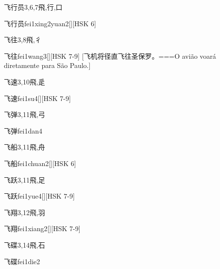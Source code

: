 \begin{Entry}{飞行员}{3,6,7}{⾶,⾏,⼝}
  \begin{Phonetics}{飞行员}{fei1xing2yuan2}[][HSK 6]
  \end{Phonetics}
\end{Entry}

\begin{Entry}{飞往}{3,8}{⾶,⼻}
  \begin{Phonetics}{飞往}{fei1wang3}[][HSK 7-9]
    [飞机将径直飞往圣保罗。===O avião voará diretamente para São Paulo.]
  \end{Phonetics}
\end{Entry}

\begin{Entry}{飞速}{3,10}{⾶,⾡}
  \begin{Phonetics}{飞速}{fei1su4}[][HSK 7-9]
  \end{Phonetics}
\end{Entry}

\begin{Entry}{飞弹}{3,11}{⾶,⼸}
  \begin{Phonetics}{飞弹}{fei1dan4}
  \end{Phonetics}
\end{Entry}

\begin{Entry}{飞船}{3,11}{⾶,⾈}
  \begin{Phonetics}{飞船}{fei1chuan2}[][HSK 6]
  \end{Phonetics}
\end{Entry}

\begin{Entry}{飞跃}{3,11}{⾶,⾜}
  \begin{Phonetics}{飞跃}{fei1yue4}[][HSK 7-9]
  \end{Phonetics}
\end{Entry}

\begin{Entry}{飞翔}{3,12}{⾶,⽻}
  \begin{Phonetics}{飞翔}{fei1xiang2}[][HSK 7-9]
  \end{Phonetics}
\end{Entry}

\begin{Entry}{飞碟}{3,14}{⾶,⽯}
  \begin{Phonetics}{飞碟}{fei1die2}
  \end{Phonetics}
\end{Entry}


